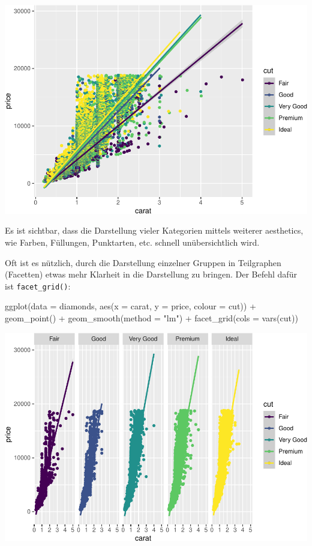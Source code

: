 \documentclass[
]{book}
\newenvironment{Shaded}{\begin{snugshade}}{\end{snugshade}}
\newcommand{\AttributeTok}[1]{\textcolor[rgb]{0.77,0.63,0.00}{#1}}
\newcommand{\FunctionTok}[1]{\textcolor[rgb]{0.00,0.00,0.00}{#1}}
\newcommand{\NormalTok}[1]{#1}
\newcommand{\SpecialCharTok}[1]{\textcolor[rgb]{0.00,0.00,0.00}{#1}}
\newcommand{\StringTok}[1]{\textcolor[rgb]{0.31,0.60,0.02}{#1}}
\begin{document}
\includegraphics{CFH_R_bookdown_files/figure-latex/unnamed-chunk-170-1.pdf}

Es ist sichtbar, dass die Darstellung vieler Kategorien mittels weiterer aesthetics, wie Farben, Füllungen, Punktarten, etc. schnell unübersichtlich wird.

Oft ist es nützlich, durch die Darstellung einzelner Gruppen in Teilgraphen (Facetten) etwas mehr Klarheit in die Darstellung zu bringen. Der Befehl dafür ist \texttt{facet\_grid()}:

\begin{Shaded}
\begin{Highlighting}[]
\FunctionTok{ggplot}\NormalTok{(}\AttributeTok{data =}\NormalTok{ diamonds, }\FunctionTok{aes}\NormalTok{(}\AttributeTok{x =}\NormalTok{ carat, }\AttributeTok{y =}\NormalTok{ price, }\AttributeTok{colour =}\NormalTok{ cut)) }\SpecialCharTok{+}
  \FunctionTok{geom\_point}\NormalTok{() }\SpecialCharTok{+}
  \FunctionTok{geom\_smooth}\NormalTok{(}\AttributeTok{method =} \StringTok{"lm"}\NormalTok{) }\SpecialCharTok{+}
  \FunctionTok{facet\_grid}\NormalTok{(}\AttributeTok{cols =} \FunctionTok{vars}\NormalTok{(cut))}
\end{Highlighting}
\end{Shaded}

\includegraphics{CFH_R_bookdown_files/figure-latex/unnamed-chunk-171-1.pdf}
\end{document}
